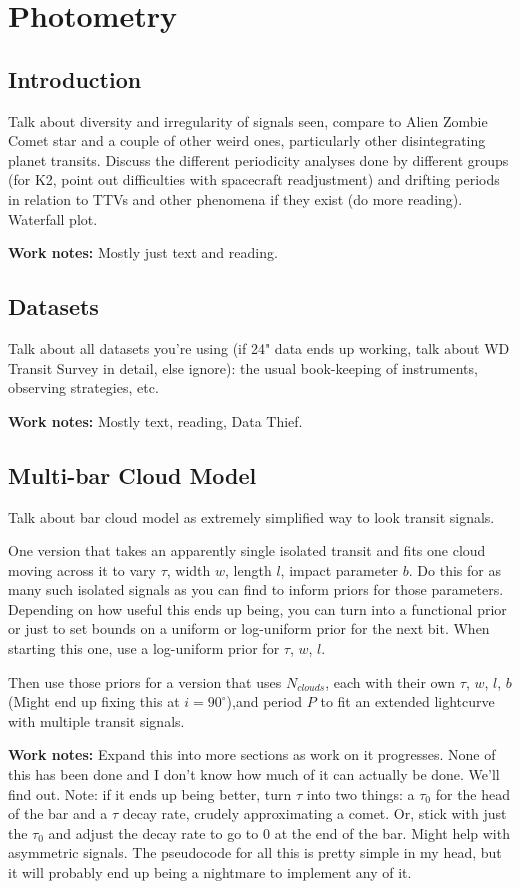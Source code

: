 \chapter{Photometry}
\label{chapter_photo}

\section{Introduction}
\label{photo_intro}
Talk about diversity and irregularity of signals seen, compare to Alien Zombie Comet star and a couple of other weird ones, particularly other disintegrating planet transits. Discuss the different periodicity analyses done by different groups (for K2, point out difficulties with spacecraft readjustment) and drifting periods in relation to TTVs and other phenomena if they exist (do more reading). Waterfall plot.


\textbf{Work notes:} Mostly just text and reading. 

\section{Datasets}
\label{photo_datasets}
Talk about all datasets you're using (if 24" data ends up working, talk about WD Transit Survey in detail, else ignore): the usual book-keeping of instruments, observing strategies, etc.

\textbf{Work notes:} Mostly text, reading, Data Thief. 



\section{Multi-bar Cloud Model}
\label{photo_barcloud}
Talk about bar cloud model as extremely simplified way to look transit signals.

One version that takes an apparently single isolated transit and fits one cloud moving across it to vary $\tau$, width $w$, length $l$, impact parameter $b$. Do this for as many such isolated signals as you can find to inform priors for those parameters. Depending on how useful this ends up being, you can turn into a functional prior or just to set bounds on a uniform or log-uniform prior for the next bit. When starting this one, use a log-uniform prior for $\tau$, $w$, $l$. 

Then use those priors for a version that uses $N_{clouds}$, each with their own $\tau$, $w$, $l$, $b$ (Might end up fixing this at $i = 90^{\circ}$),and period $P$ to fit an extended lightcurve with multiple transit signals.

\textbf{Work notes:} Expand this into more sections as work on it progresses. None of this has been done and I don't know how much of it can actually be done. We'll find out. Note: if it ends up being better, turn $\tau$ into two things: a $\tau_0$ for the head of the bar and a $\tau$ decay rate, crudely approximating a comet. Or, stick with just the $\tau_0$ and adjust the decay rate to go to 0 at the end of the bar. Might help with asymmetric signals. The pseudocode for all this is pretty simple in my head, but it will probably end up being a nightmare to implement any of it. 


